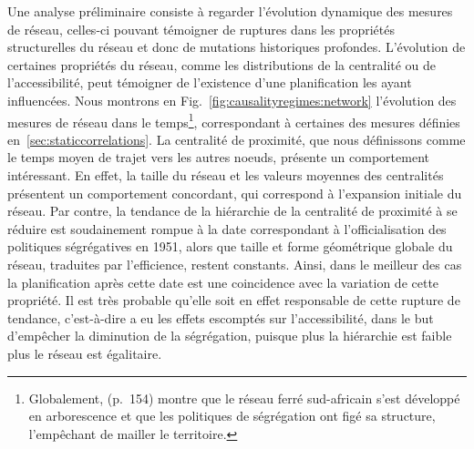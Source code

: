 {Une analyse préliminaire consiste à regarder l'évolution dynamique des mesures de réseau, celles-ci pouvant témoigner de ruptures dans les propriétés structurelles du réseau et donc de mutations historiques profondes. L'évolution de certaines propriétés du réseau, comme les distributions de la centralité ou de l'accessibilité, peut témoigner de l'existence d'une planification les ayant influencées. Nous montrons en Fig.~\ref{fig:causalityregimes:network} l'évolution des mesures de réseau dans le temps\footnote{Globalement, \cite{baffi:tel-01389347} (p.~154) montre que le réseau ferré sud-africain s'est développé en arborescence et que les politiques de ségrégation ont figé sa structure, l'empêchant de mailler le territoire.}, correspondant à certaines des mesures définies en~\ref{sec:staticcorrelations}. La centralité de proximité, que nous définissons comme le temps moyen de trajet vers les autres noeuds, présente un comportement intéressant. En effet, la taille du réseau et les valeurs moyennes des centralités présentent un comportement concordant, qui correspond à l'expansion initiale du réseau. Par contre, la tendance de la hiérarchie de la centralité de proximité à se réduire est soudainement rompue à la date correspondant à l'officialisation des politiques ségrégatives en 1951, alors que taille et forme géométrique globale du réseau, traduites par l'efficience, restent constants. Ainsi, dans le meilleur des cas la planification après cette date est une coincidence avec la variation de cette propriété. Il est très probable qu'elle soit en effet responsable de cette rupture de tendance, c'est-à-dire a eu les effets escomptés sur l'accessibilité, dans le but d'empêcher la diminution de la ségrégation, puisque plus la hiérarchie est faible plus le réseau est égalitaire.
}


